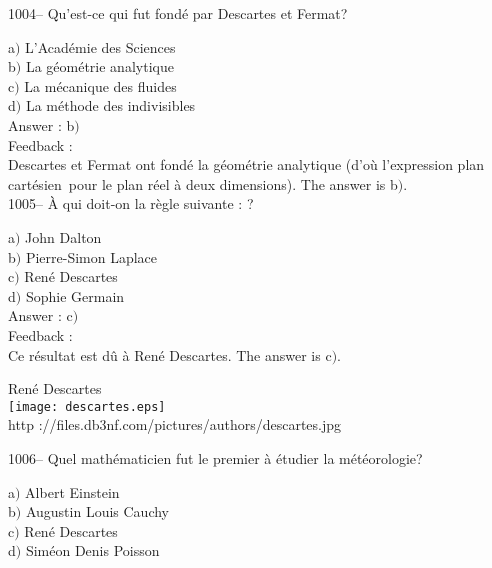 \documentclass[letterpaper, 12pt]{article}
\begin{document}
1004-- Qu'est-ce qui fut fond\'e par Descartes et Fermat?

a$)$ L'Acad\'emie des Sciences \\
b$)$ La g\'eom\'etrie analytique \\
c$)$ La m\'ecanique des fluides \\
d$)$ La m\'ethode des indivisibles\\

Answer : b$)$\\

Feedback : \\
Descartes et Fermat ont fond\'e la g\'eom\'etrie analytique (d'o\`u
l'expression \og plan cart\'esien\fg\ pour le plan r\'eel \`a deux
dimensions).
The answer is b$)$.\\

1005-- \`A qui doit-on la r\`egle suivante : \fg ?

a$)$ John Dalton \\
b$)$ Pierre-Simon Laplace \\
c$)$ Ren\'e Descartes \\
d$)$ Sophie Germain\\

Answer : c$)$\\

Feedback : \\
Ce r\'esultat est d\^u \`a Ren\'e Descartes.
The answer is c$)$.\\

        \begin{center}
        Ren\'e Descartes\\
    \texttt{[image: descartes.eps]}\\
        {\footnotesize http
://files.db3nf.com/pictures/authors/descartes.jpg}
    \end{center}

1006-- Quel math\'ematicien fut le premier \`a \'etudier la
m\'et\'eorologie?

a$)$ Albert Einstein \\
b$)$ Augustin Louis Cauchy \\
c$)$ Ren\'e Descartes \\
d$)$ Sim\'eon Denis Poisson\\
\end{document}

